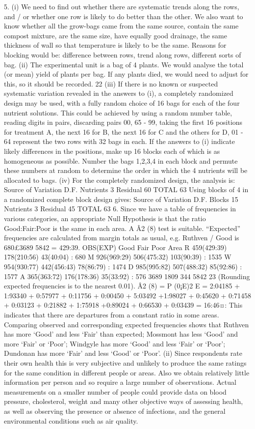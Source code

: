 5. (i) We need to find out whether there are systematic trends along the rows, and
/ or whether one row is likely to do better than the other.
We also want to know whether all the grow-bags came from the same source,
contain the same compost mixture, are the same size, have equally good
drainage, the same thickness of wall so that temperature is likely to be the
same.
Reasons for blocking would be: difference between rows, trend along rows,
different sorts of bag.
(ii) The experimental unit is a bag of 4 plants. We would analyse the total (or
mean) yield of plants per bag. If any plants died, we would need to adjust
for this, so it should be recorded.
22
(iii) If there is no known or suspected systematic variation revealed in the answers
to (i), a completely randomized design may be used, with a fully random
choice of 16 bags for each of the four nutrient solutions. This could be
achieved by using a random number table, reading digits in pairs, discarding
pairs 00, 65 - 99, taking the first 16 positions for treatment A, the next 16
for B, the next 16 for C and the others for D, 01 - 64 represent the two rows
with 32 bags in each.
If the answers to (i) indicate likely differences in the positions, make up 16
blocks each of which is as homogeneous as possible. Number the bags 1,2,3,4
in each block and permute these numbers at random to determine the order
in which the 4 nutrients will be allocated to bags.
(iv) For the completely randomized design, the analysis is:
Source of Variation D.F.
Nutrients 3
Residual 60
TOTAL 63
Using blocks of 4 in a randomized complete block design gives:
Source of Variation D.F.
Blocks 15
Nutrients 3
Residual 45
TOTAL 63
6. Since we have a table of frequencies in various categories, an appropriate Null
Hypothesis is that the ratio Good:Fair:Poor is the same in each area. A Â2
(8)
test is suitable. “Expected” frequencies are calculated from margin totals as
usual, e.g. Ruthven / Good is 680£3689
5842 = 429:39.
OBS(EXP) Good Fair Poor
Area R 459(429:39) 178(210:56) 43(40:04) : 680
M 926(969:29) 506(475:32) 103(90:39) : 1535
W 954(930:77) 442(456:43) 78(86:79) : 1474
D 985(995:82) 507(488:32) 85(92:86) : 1577
A 365(363:72) 176(178:36) 35(33:92) : 576
3689 1809 344 5842
23
(Rounding expected frequencies is to the nearest 0.01).
Â2
(8) =
P (0¡E)2
E = 2:04185 + 1:93340 + 0:57977 + 0:11756 + 0:00450 + 5:03492
+1:98027 + 0:45620 + 0:71458 + 0:03123 + 0:21882 + 1:75918
+0:89024 + 0:66530 + 0:03439 = 16:46¤:
This indicates that there are departures from a constant ratio in some areas.
Comparing observed and corresponding expected frequencies shows that
Ruthven has more ‘Good’ and less ‘Fair’ than expected; Mossmont has less
‘Good’ and more ‘Fair’ or ‘Poor’; Windgyle has more ‘Good’ and less ‘Fair’
or ‘Poor’; Dundonan has more ‘Fair’ and less ‘Good’ or ‘Poor’.
(ii) Since respondents rate their own health this is very subjective and unlikely
to produce the same ratings for the same condition in different people or
areas. Also we obtain relatively little information per person and so require
a large number of observations.
Actual measurements on a smaller number of people could provide data
on blood pressure, cholesterol, weight and many other objective ways of
assessing health, as well as observing the presence or absence of infections,
and the general environmental conditions such as air quality.
